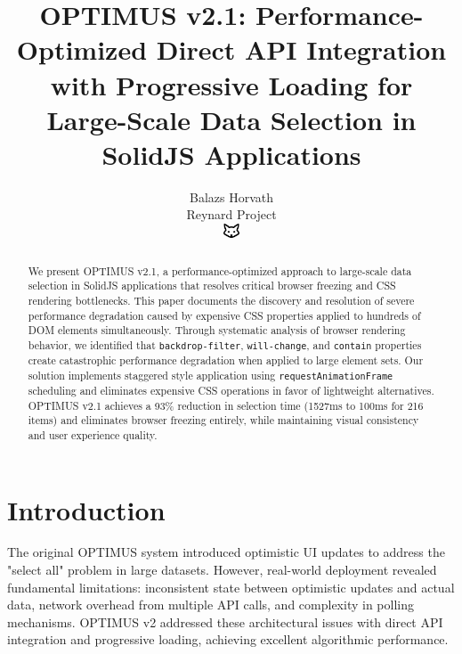 \documentclass[10pt]{article}
\begin{document}
\title{OPTIMUS v2.1: Performance-Optimized Direct API Integration with Progressive Loading for Large-Scale Data Selection in SolidJS Applications}

\author{Balazs Horvath\\
Reynard Project\\
\includegraphics[width=0.5cm]{../../shared-assets/favicon.pdf}}

\maketitle

\begin{abstract}
We present OPTIMUS v2.1, a performance-optimized approach to large-scale data selection in SolidJS applications that resolves critical browser freezing and CSS rendering bottlenecks. This paper documents the discovery and resolution of severe performance degradation caused by expensive CSS properties applied to hundreds of DOM elements simultaneously. Through systematic analysis of browser rendering behavior, we identified that \texttt{backdrop-filter}, \texttt{will-change}, and \texttt{contain} properties create catastrophic performance degradation when applied to large element sets. Our solution implements staggered style application using \texttt{requestAnimationFrame} scheduling and eliminates expensive CSS operations in favor of lightweight alternatives. OPTIMUS v2.1 achieves a 93\% reduction in selection time (1527ms to 100ms for 216 items) and eliminates browser freezing entirely, while maintaining visual consistency and user experience quality.
\end{abstract}

\section{Introduction}

The original OPTIMUS system introduced optimistic UI updates to address the "select all" problem in large datasets. However, real-world deployment revealed fundamental limitations: inconsistent state between optimistic updates and actual data, network overhead from multiple API calls, and complexity in polling mechanisms. OPTIMUS v2 addressed these architectural issues with direct API integration and progressive loading, achieving excellent algorithmic performance.
\end{document}
